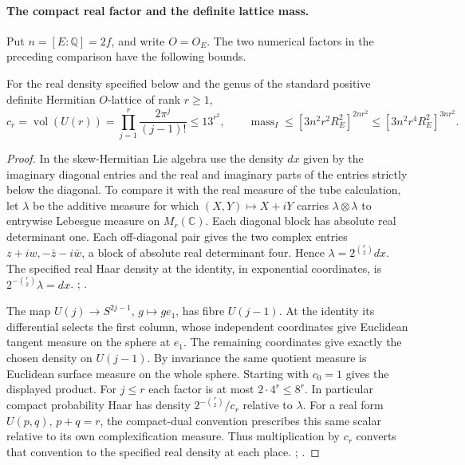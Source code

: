 \paragraph{The compact real factor and the definite lattice mass.}
Put \(n=[E:\mathbb Q]=2f\), and write \(O=O_E\). The two numerical
factors in the preceding comparison have the following bounds.
\begin{proposition}\label{bergvol:compactmass}
For the real density specified below and the genus of the standard
positive definite Hermitian \(O\)-lattice of rank \(r\ge1\),
\[
 c_r=\operatorname{vol}(U(r))
     =\prod_{j=1}^r\frac{2\pi^j}{(j-1)!}\le13^{r^2},
 \qquad
 \operatorname{mass}_I
     \le [3n^2r^2R_E^2]^{2nr^2}
     \le[3n^2r^4R_E^2]^{3nr^2}.
\]
\end{proposition}
\begin{proof}
In the skew-Hermitian Lie algebra use the density \(dx\) given by
the imaginary diagonal entries and the real and imaginary parts of
the entries strictly below the diagonal. To compare it with the real
measure of the tube calculation, let \(\lambda\) be the additive
measure for which \((X,Y)\mapsto X+iY\) carries
\(\lambda\otimes\lambda\) to entrywise Lebesgue measure on
\(M_r(\mathbb C)\). Each diagonal block has absolute real determinant
one. Each off-diagonal pair gives the two complex entries
\(z+iw,-\bar z-i\bar w\), a block of absolute real determinant four.
Hence \(\lambda=2^{\binom r2}dx\). The specified real Haar density
at the identity, in exponential coordinates, is
\(2^{-\binom r2}\lambda=dx\).
;
.

The map \(U(j)\to S^{2j-1}\), \(g\mapsto ge_1\), has fibre
\(U(j-1)\). At the identity its differential selects the first
column, whose independent coordinates give Euclidean tangent
measure on the sphere at \(e_1\). The remaining coordinates give
exactly the chosen density on \(U(j-1)\). By invariance the same
quotient measure is Euclidean surface measure on the whole sphere.
Starting with \(c_0=1\) gives the displayed product. For \(j\le r\)
each factor is at most \(2\cdot4^r\le8^r\).
In particular compact probability Haar has density
\(2^{-\binom r2}/c_r\) relative to \(\lambda\). For a real form
\(U(p,q)\), \(p+q=r\), the compact-dual convention prescribes this
same scalar relative to its own complexification measure. Thus
multiplication by \(c_r\) converts that convention to the specified
real density at each place.
;
.


\end{proof}
